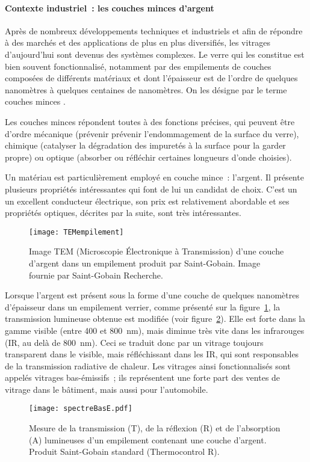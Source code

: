 \paragraph*{Contexte industriel~: les couches minces d'argent\newline}

Après de nombreux développements techniques et industriels et afin de répondre à des marchés et des applications de plus en plus diversifiés, les vitrages d'aujourd'hui sont devenus des systèmes complexes. Le verre qui les constitue est bien souvent fonctionnalisé, notamment par des empilements de couches composées de différents matériaux et dont l'épaisseur est de l'ordre de quelques nanomètres à quelques centaines de nanomètres. On les désigne par le terme \og couches minces \fg.\par 
Les couches minces répondent toutes à des fonctions précises, qui peuvent être d'ordre mécanique (prévenir prévenir l'endommagement de la surface du verre), chimique (catalyser la dégradation des impuretés à la surface pour la garder propre) ou optique (absorber ou réfléchir certaines longueurs d'onde choisies).\par 
Un matériau est particulièrement employé en couche mince~: l'argent. Il présente plusieurs propriétés intéressantes qui font de lui un candidat de choix. C'est un un excellent conducteur électrique, son prix est relativement abordable et ses propriétés optiques, décrites par la suite, sont très intéressantes.\par 
\begin{figure}[!htb]
\centering
\texttt{[image: TEMempilement]}
\caption{Image TEM (Microscopie Électronique à Transmission) d'une couche d'argent dans un empilement produit par Saint-Gobain. Image fournie par Saint-Gobain Recherche.}
\label{TEMthinLayer}
\end{figure}
Lorsque l'argent est présent sous la forme d'une couche de quelques nanomètres d'épaisseur dans un empilement verrier, comme présenté sur la figure~\ref{TEMthinLayer}, la transmission lumineuse obtenue est modifiée (voir figure~\ref{transmissionStack}). Elle est forte dans la gamme visible (entre 400 et 800~nm), mais diminue très vite dans les infrarouges (IR, au delà de 800~nm). Ceci se traduit donc par un vitrage toujours transparent dans le visible, mais réfléchissant dans les IR, qui sont responsables de la transmission radiative de chaleur. Les vitrages ainsi fonctionnalisés sont appelés vitrages bas-émissifs~; ils représentent une forte part des ventes de vitrage dans le bâtiment, mais aussi pour l'automobile.\par 
\begin{figure}[!htb]
\centering
\texttt{[image: spectreBasE.pdf]}
\caption{Mesure de la transmission (T), de la réflexion (R) et de l'absorption (A) lumineuses d'un empilement contenant une couche d'argent. Produit Saint-Gobain standard (Thermocontrol R).}
\label{transmissionStack}
\end{figure}


